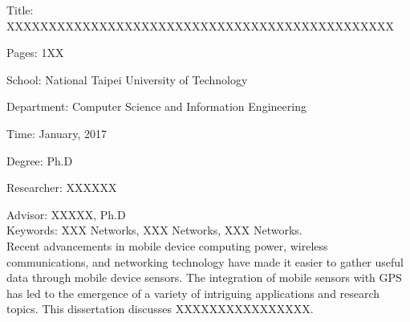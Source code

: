 Title: XXXXXXXXXXXXXXXXXXXXXXXXXXXXXXXXXXXXXXXXXXXXXX

\noindent Pages: 1XX

\noindent School: National Taipei University of Technology

\noindent Department: Computer Science and Information Engineering

\noindent Time: January, 2017

\noindent Degree: Ph.D

\noindent Researcher: XXXXXX

\noindent Advisor: XXXXX, Ph.D\\

\noindent Keywords: XXX Networks, XXX Networks, XXX Networks.\\

Recent advancements in mobile device computing power, wireless communications, and networking technology have made it easier to gather useful data through mobile device sensors. The integration of mobile sensors with GPS has led to the emergence of a variety of intriguing applications and research topics. This dissertation discusses XXXXXXXXXXXXXXXX.
